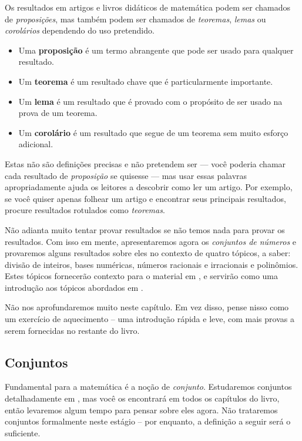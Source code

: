 Os resultados em artigos e livros didáticos de matemática podem ser chamados de \textit{proposições}, mas também podem ser chamados de \textit{teoremas}, \textit{lemas} ou \textit{corolários} dependendo do uso pretendido.
\begin{itemize}
\item Uma \textbf{proposição} é um termo abrangente que pode ser usado para qualquer resultado.
\item Um \textbf{teorema} é um resultado chave que é particularmente importante.
\item Um \textbf{lema} é um resultado que é provado com o propósito de ser usado na prova de um teorema.
\item Um \textbf{corolário} é um resultado que segue de um teorema sem muito esforço adicional.
\end{itemize}
Estas não são definições precisas e não pretendem ser --- você poderia chamar cada resultado de \textit{proposição} se quisesse --- mas usar essas palavras apropriadamente ajuda os leitores a descobrir como ler um artigo. Por exemplo, se você quiser apenas folhear um artigo e encontrar seus principais resultados, procure resultados rotulados como \textit{teoremas}.

Não adianta muito tentar provar resultados se não temos nada para provar os resultados. Com isso em mente, apresentaremos agora os \textit{conjuntos de números} e provaremos alguns resultados sobre eles no contexto de quatro tópicos, a saber: divisão de inteiros, bases numéricas, números racionais e irracionais e polinômios. Estes tópicos fornecerão contexto para o material em , e servirão como uma introdução aos tópicos abordados em .


Não nos aprofundaremos muito neste capítulo. Em vez disso, pense nisso como um exercício de aquecimento – uma introdução rápida e leve, com mais provas a serem fornecidas no restante do livro.

\subsection*{Conjuntos}

Fundamental para a matemática é a noção de \textit{conjunto}. Estudaremos conjuntos detalhadamente em , mas você os encontrará em todos os capítulos do livro, então levaremos algum tempo para pensar sobre eles agora. Não trataremos conjuntos formalmente neste estágio – por enquanto, a definição a seguir será o suficiente.

